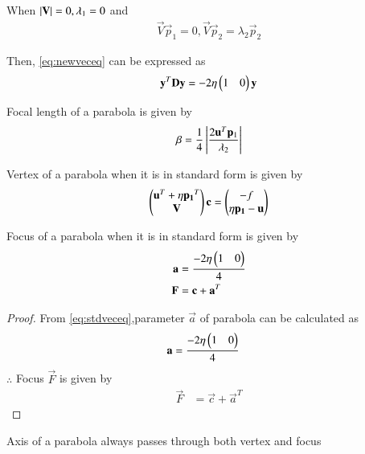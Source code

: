 \documentclass[journal,12pt,twocolumn]{IEEEtran}
\begin{document}
\begin{lemma}
When $\left\vert\mathbf{V}\right\vert = 0, \lambda_1 = 0$ and 
\begin{align}
\vec{V}\vec{p}_1 = 0, 
\vec{V}\vec{p}_2 = \lambda_2\vec{p}_2
\end{align}

Then, \eqref{eq:newveceq} can be expressed as 
\begin{align}
\mathbf{y}^T\mathbf{D}\mathbf{y} = -2\eta\begin{pmatrix}1 & 0\end{pmatrix}\mathbf{y} \label{eq:stdveceq}
\end{align}
\end{lemma}

\begin{lemma}
Focal length of a parabola is given by
\begin{align}
\beta = \frac{1}{4}\left\vert\frac{2\mathbf{u}^T\mathbf{p}_1}{\lambda_2}\right\vert \label{eq:foclen} \end{align}
\end{lemma}

\begin{lemma}
Vertex of a parabola when it is in standard form is given by 
\begin{align}
\begin{pmatrix}\mathbf{u}^T + \eta\mathbf{p_1}^T \\ \mathbf{V}\end{pmatrix}\mathbf{c} = \begin{pmatrix}-f \\ \eta\mathbf{p_1} - \mathbf{u}\end{pmatrix} \label{eq:vertex}
\end{align}
\end{lemma}

\begin{lemma}
Focus of a parabola when it is in standard form is given by 
\begin{align}
\mathbf{a} &= \frac{-2\eta\begin{pmatrix}1 & 0\end{pmatrix}}{4} 
\\
\mathbf{F} &= \mathbf{c} + \mathbf{a}^T  \label{eq:focus}
\end{align}
\end{lemma}

\begin{proof}
From \eqref{eq:stdveceq},parameter $\vec{a}$ of parabola can be calculated as
\begin{align}
\mathbf{a} &= \frac{-2\eta\begin{pmatrix}1 & 0\end{pmatrix}}{4} 
\end{align}
$\therefore$ Focus $\vec{F}$ is given by
\begin{align}
\vec{F} &= \vec{c} + \vec{a}^T  
\end{align}
\end{proof}

\begin{definition}
Axis  of  a parabola  always passes through  both  vertex and focus
\label{def:1}
\end{definition}
\end{document}
